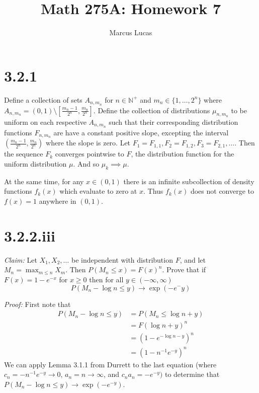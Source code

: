 \documentclass[10pt]{article}
\title{Math 275A: Homework 7}
\author{Marcus Lucas}
\date{\vspace{-1cm}}
\begin{document}
\maketitle

\section*{3.2.1}

Define a collection of sets $A_{n,m_n}$ for $n \in \mathbb{N}^+$
and $m_n \in \{1,\dots,2^n\}$ where 
$A_{n,m_n} = (0,1) \setminus [\frac{m_n-1}{2^n}, \frac{m_n}{2^n}]$.
Define the collection of distributions $\mu_{n,m_n}$
to be uniform on each respective $A_{n,m_n}$
such that their corresponding distribution functions $F_{n,m_n}$
are have a constant positive slope, excepting the interval 
$(\frac{m_n-1}{2^n}, \frac{m_n}{2^n})$ where the slope is zero.
Let $F_1 = F_{1,1}, F_2 = F_{1,2}, F_3 = F_{2,1}, \dots$.
Then the sequence $F_k$ converges pointwise to $F$, 
the distribution function for the uniform distribution $\mu$.
And so $\mu_k \implies \mu$. 

At the same time, for any $x \in (0,1)$ there is an infinite
subcollection of density functions $f_k(x)$ which evaluate to
zero at $x$. Thus $f_k(x)$ does not converge to $f(x) = 1$
anywhere in $(0,1)$.


\section*{3.2.2.iii}
\textit{Claim:}
Let $X_1, X_2, \dots$ be independent with distribution $F$,
and let $M_n = \max_{m \le n}X_m$. Then $P(M_n \le x) = F(x)^n$.
Prove that if $F(x) = 1-e^{-x}$ for $x \ge 0$ then for all
$y \in (-\infty, \infty)$
\begin{equation*}
  P(M_n - \log n \le y) \to \exp(-e^-y)
\end{equation*}

\textit{Proof:}
First note that
\begin{equation*}
\begin{aligned}
  P(M_n - \log n \le y) &= P(M_n \le \log n + y) \\
  &= F(\log n + y)^n \\
  &= (1 - e^{-\log n - y})^n \\
  &= (1 - n^{-1}e^{-y})^n
\end{aligned}
\end{equation*}
We can apply Lemma 3.1.1 from Durrett to the last equation
(where $c_n = -n^{-1}e^{-y} \to 0$, $a_n = n \to \infty$,
and $c_n a_n = -e^{-y})$ to determine that
$P(M_n - \log n \le y) \to \exp(-e^{-y})$.
\end{document}
